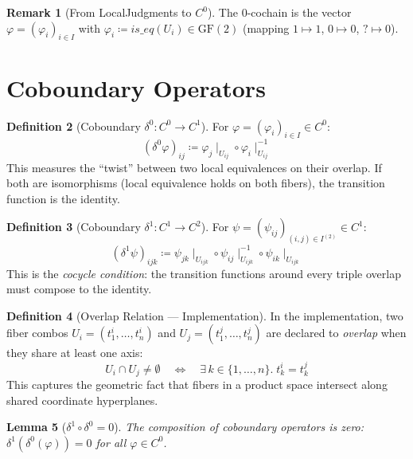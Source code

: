 \documentclass[11pt,a4paper]{report}
\theoremstyle{definition}
\newtheorem{definition}{Definition}[chapter]
\newtheorem{remark}[definition]{Remark}
\theoremstyle{plain}
\newtheorem{lemma}[definition]{Lemma}
\newcommand{\restr}[2]{#1\!\!\mid_{#2}}
\begin{document}
\begin{remark}[From LocalJudgments to $C^0$]
The 0-cochain is the vector
$\varphi = (\varphi_i)_{i \in I}$ with
$\varphi_i \coloneqq \mathit{is\_eq}(U_i) \in \mathrm{GF}(2)$
(mapping $1 \mapsto 1$, $0 \mapsto 0$, ${?} \mapsto 0$).
\end{remark}

\section{Coboundary Operators}

\begin{definition}[Coboundary $\delta^0 : C^0 \to C^1$]
\label{def:delta0}
For $\varphi = (\varphi_i)_{i \in I} \in C^0$:
\[
  (\delta^0 \varphi)_{ij} \coloneqq \restr{\varphi_j}{U_{ij}} \circ
    \restr{\varphi_i}{U_{ij}}^{-1}
\]
This measures the ``twist'' between two local equivalences on their
overlap.  If both are isomorphisms (local equivalence holds on both
fibers), the transition function is the identity.
\end{definition}

\begin{definition}[Coboundary $\delta^1 : C^1 \to C^2$]
\label{def:delta1}
For $\psi = (\psi_{ij})_{(i,j) \in I^{(2)}} \in C^1$:
\[
  (\delta^1 \psi)_{ijk} \coloneqq \restr{\psi_{jk}}{U_{ijk}} \circ
    \restr{\psi_{ij}}{U_{ijk}}^{-1} \circ \restr{\psi_{ik}}{U_{ijk}}
\]
This is the \emph{cocycle condition}: the transition functions around
every triple overlap must compose to the identity.
\end{definition}

\begin{definition}[Overlap Relation --- Implementation]
\label{def:overlap-impl}
In the implementation, two fiber combos $U_i = (t_1^i, \ldots, t_n^i)$
and $U_j = (t_1^j, \ldots, t_n^j)$ are declared to \emph{overlap}
when they share at least one axis:
\[
  U_i \cap U_j \neq \emptyset
  \quad\Longleftrightarrow\quad
  \exists\, k \in \{1, \ldots, n\}.\;
    t_k^i = t_k^j
\]
This captures the geometric fact that fibers in a product space
intersect along shared coordinate hyperplanes.
\end{definition}

\begin{lemma}[$\delta^1 \circ \delta^0 = 0$]
\label{lem:d1d0}
The composition of coboundary operators is zero:
$\delta^1(\delta^0(\varphi)) = 0$ for all $\varphi \in C^0$.
\end{lemma}
\end{document}
